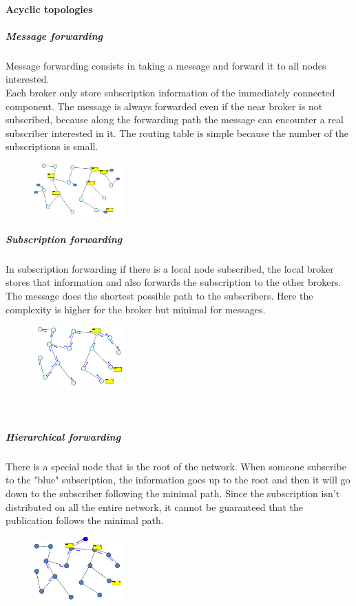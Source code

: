 \documentclass[10pt,a4paper]{article}
\begin{document}
\paragraph{Acyclic topologies}
\subparagraph{Message forwarding} 
Message forwarding consists in taking a message and forward it to all nodes interested. \\
Each broker only store subscription information of the immediately connected component. The message is always forwarded even if the near broker is not subscribed, because along the forwarding path the message can encounter a real subscriber interested in it. The routing table is simple because the number of the subscriptions is small. \\
 \begin{figure}[h!]
 \hfill \includegraphics[width=100pt]{images/message-forwarding.png}\hspace*{\fill}
  \label{fig:message-forw}
\end{figure}
\subparagraph{Subscription forwarding} 
In subscription forwarding if there is a local node subscribed, the local broker stores that information and also forwards the subscription to the other brokers. The message does the shortest possible path to the subscribers. Here the complexity is higher for the broker but minimal for messages. \\
 \begin{figure}[h!]
 \hfill \includegraphics[width=100pt]{images/subscription-forwarding.png}\hspace*{\fill}
  \label{fig:subscription-forw}
\end{figure} \\
\subparagraph{Hierarchical forwarding}
There is a special node that is the root of the network. When someone subscribe to the "blue" subscription, the information goes up to the root and then it will go down to the subscriber following the minimal path. Since the subscription isn't distributed on all the entire network, it cannot be guaranteed that the publication follows the minimal path. 
 \begin{figure}[h!]
 \hfill \includegraphics[width=100pt]{images/hierarchical-forwarding.png}\hspace*{\fill}
  \label{fig:hierarchical-forw}
\end{figure}
\end{document}
